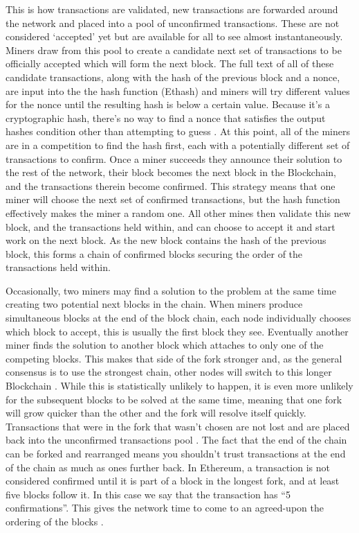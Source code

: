 \documentclass{article}
\begin{document}
This is how transactions are validated, new transactions are forwarded around the network and placed into a pool of unconfirmed transactions. These are not considered `accepted' yet but are available for all to see almost instantaneously. Miners draw from this pool to create a candidate next set of transactions to be officially accepted which will form the next block. The full text of all of these candidate transactions, along with the hash of the previous block and a nonce, are input into the the hash function (Ethash) and miners will try different values for the nonce until the resulting hash is below a certain value. Because it's a cryptographic hash, there's no way to find a nonce that satisfies the output hashes condition other than attempting to guess \citep{20_developer_guide_bitcoin_2016}. At this point, all of the miners are in a competition to find the hash first, each with a potentially different set of transactions to confirm. Once a miner succeeds they announce their solution to the rest of the network, their block becomes the next block in the Blockchain, and the transactions therein become confirmed. This strategy means that one miner will choose the next set of confirmed transactions, but the hash function effectively makes the miner a random one. All other mines then validate this new block, and the transactions held within, and can choose to accept it and start work on the next block. As the new block contains the hash of the previous block, this forms a chain of confirmed blocks securing the order of the transactions held within.

Occasionally, two miners may find a solution to the problem at the same time creating two potential next blocks in the chain. When miners produce simultaneous blocks at the end of the block chain, each node individually chooses which block to accept, this is usually the first block they see. Eventually another miner finds the solution to another block which attaches to only one of the competing blocks. This makes that side of the fork stronger and, as the general consensus is to use the strongest chain, other nodes will switch to this longer Blockchain \citep{20_developer_guide_bitcoin_2016}. While this is statistically unlikely to happen, it is even more unlikely for the subsequent blocks to be solved at the same time, meaning that one fork will grow quicker than the other and the fork will resolve itself quickly. Transactions that were in the fork that wasn't chosen are not lost and are placed back into the unconfirmed transactions pool \citep{4_driscoll_2016}. The fact that the end of the chain can be forked and rearranged means you shouldn't trust transactions at the end of the chain as much as ones further back. In Ethereum, a transaction is not considered confirmed until it is part of a block in the longest fork, and at least five blocks follow it. In this case we say that the transaction has ``5 confirmations''. This gives the network time to come to an agreed-upon the ordering of the blocks \citep{35_nielsen_2013}.
\end{document}
